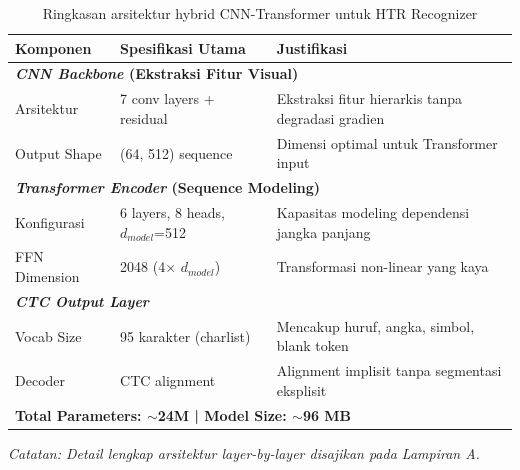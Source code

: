 \documentclass[12pt,a4paper]{article}
\begin{document}
\begin{table}[H]
\centering
\caption{Ringkasan arsitektur hybrid CNN-Transformer untuk HTR Recognizer}
\label{tab:recognizer-architecture}
\small
\begin{tabular}{|l|l|p{7cm}|}
\hline
\textbf{Komponen} & \textbf{Spesifikasi Utama} & \textbf{Justifikasi} \\ \hline
\multicolumn{3}{|l|}{\textbf{\textit{CNN Backbone} (Ekstraksi Fitur Visual)}} \\ \hline
Arsitektur & 7 conv layers + residual & Ekstraksi fitur hierarkis tanpa degradasi gradien \\ \hline
Output Shape & (64, 512) sequence & Dimensi optimal untuk Transformer input \\ \hline
\multicolumn{3}{|l|}{\textbf{\textit{Transformer Encoder} (Sequence Modeling)}} \\ \hline
Konfigurasi & 6 layers, 8 heads, $d_{model}$=512 & Kapasitas modeling dependensi jangka panjang \\ \hline
FFN Dimension & 2048 (4× $d_{model}$) & Transformasi non-linear yang kaya \\ \hline
\multicolumn{3}{|l|}{\textbf{\textit{CTC Output Layer}}} \\ \hline
Vocab Size & 95 karakter (charlist) & Mencakup huruf, angka, simbol, blank token \\ \hline
Decoder & CTC alignment & Alignment implisit tanpa segmentasi eksplisit \\ \hline
\multicolumn{3}{|l|}{\textbf{Total Parameters: $\sim$24M | Model Size: $\sim$96 MB}} \\ \hline
\end{tabular}
\end{table}

\textit{Catatan: Detail lengkap arsitektur layer-by-layer disajikan pada Lampiran A.}
\end{document}
